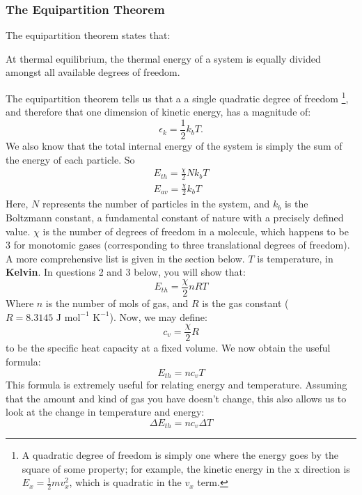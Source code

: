 \subsubsection{The Equipartition Theorem}
The equipartition theorem states that:
\begin{center}
    At thermal equilibrium, the thermal energy of a system is equally divided amongst all available degrees of freedom.
\end{center}
The equipartition theorem tells us that a a single quadratic degree of freedom \footnote{A quadratic degree of freedom is simply one where the energy goes by the square of some property; for example, the kinetic energy in the x direction is $E_{x} = \frac{1}{2}mv_x^2$, which is quadratic in the $v_x$ term.}, and therefore that one dimension of kinetic energy, has a magnitude of:
\begin{equation*}
    \epsilon_{k}=\frac{1}{2}{k_{b}}T.
\end{equation*}
 We also know that the total internal energy of the system is simply the sum of the energy of each particle. So
\begin{gather}
    E_{th}=\frac{\chi}{2}N{k_{b}}T \\
    E_{av}=\frac{\chi}{2}{k_{b}}T
\end{gather}
Here, $N$ represents the number of particles in the system, and $k_b$ is the Boltzmann constant, a fundamental constant of nature with a precisely defined value. $\chi$ is the number of degrees of freedom in a molecule, which happens to be $3$ for monotomic gases (corresponding to three translational degrees of freedom). A more comprehensive list is given in the section below. $T$ is temperature, in \textbf{Kelvin}. In questions 2 and 3 below, you will show that:
\begin{equation}
E_{th} = \frac{\chi}{2}nRT
\end{equation}
Where $n$ is the number of mols of gas, and $R$ is the gas constant ($R = 8.3145 \textrm{ J} \textrm{ mol}^{-1} \textrm{ K}^{-1}$). Now, we may define:
\[ c_v = \frac{\chi}{2}R \]
to be the specific heat capacity at a fixed volume. We now obtain the useful formula:
\begin{equation}
    E_{th} = nc_v T
\end{equation}
This formula is extremely useful for relating energy and temperature. Assuming that the amount and kind of gas you have doesn't change, this also allows us to look at the change in temperature and energy:
\begin{equation}
    \label{eqn:(13)}
    \Delta E_{th} = nc_v \Delta T
\end{equation}
